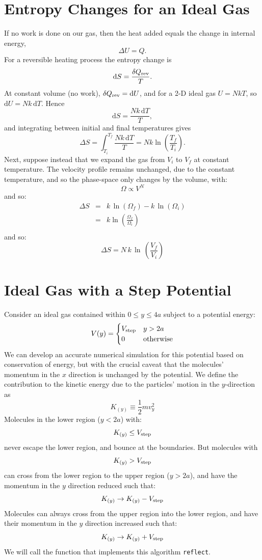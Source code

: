 \documentclass[12pt]{article}
\begin{document}
\section{Entropy Changes for an Ideal Gas}

If no work is done on our gas, then the heat added equals the change in internal energy,
$$\Delta U = Q.$$
For a reversible heating process the entropy change is
$$\mathrm{d}S = \frac{\delta Q_{\rm rev}}{T}.$$
At constant volume (no work), $\delta Q_{\rm rev} = \mathrm{d}U$, and for a 2-D ideal gas $U = NkT$, so $\mathrm{d}U = Nk\,\mathrm{d}T$. Hence
\[
\mathrm{d}S = \frac{Nk\,\mathrm{d}T}{T},
\]
and integrating between initial and final temperatures gives
\[
\Delta S = \int_{T_i}^{T_f} \frac{Nk\,\mathrm{d}T}{T} = Nk\ln\!\left(\frac{T_f}{T_i}\right).
\]
Next, suppose instead that we expand the gas from $V_i$ to $V_f$
at constant temperature.  The velocity profile remains unchanged, due
to the constant temperature, and so the phase-space only changes by
the volume, with:
$$\Omega \propto V^N$$
and so:
\begin{eqnarray*}
  \Delta S &=& k \, \ln(\Omega_f) - k \, \ln(\Omega_i) \\
           &=& k \ln\left(\frac{\Omega_f}{\Omega_i}\right) \\
\end{eqnarray*}
and so:
\begin{equation}
  \Delta S = N \,k \, \ln \,\left( \frac{V_f}{V_i} \right)
\end{equation}

\section{Ideal Gas with a Step Potential}

Consider an ideal gas contained within $0 \leq y \leq 4 a$ subject to a potential energy:
\begin{equation}
  V(y) = \begin{cases}
    V_{\rm step} & y > 2 a \\
    0 & {\rm otherwise} \\
    \end{cases}
\end{equation}
We can develop an accurate numerical simulation for this potential
based on conservation of energy, but with the crucial caveat that the
molecules' momentum in the $x$ direction is unchanged by the potential.
We define the contribution to the kinetic energy due to the particles'
motion in the $y$-direction as
\begin{equation}
  K_{(y)} \equiv \frac{1}{2} m v_y^2
\end{equation}
Molecules in the lower region ($y<2a$) with:
$$ K_{(y)} \le V_{\rm step} $$
never escape the lower region, and bounce at the boundaries.  But molecules with
$$ K_{(y)} > V_{\rm step} $$
can cross from the lower region to the upper region ($y>2a$), and have the
momentum in the $y$ direction reduced such that:
$$ K_{(y)} \to K_{(y)} - V_{\rm step} $$
Molecules can always cross from the upper region into the lower
region, and have their momentum in the $y$ direction increased such
that:
$$ K_{(y)} \to K_{(y)} + V_{\rm step} $$
We will call the function that implements this algorithm {\tt reflect}.
\end{document}
